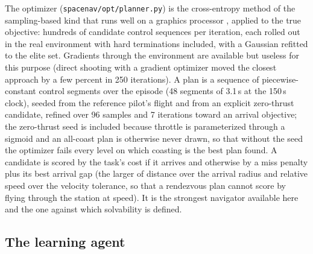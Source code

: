 \documentclass[11pt]{article}
\newcommand{\code}[1]{\texttt{\small #1}}
\begin{document}
The optimizer (\code{spacenav/opt/planner.py}) is the cross-entropy method
\cite{rubinstein1999} of the sampling-based kind that runs well on a
graphics processor \cite{williams2017}, applied to the true objective:
hundreds of candidate control sequences per iteration, each rolled out in
the real environment with hard terminations included, with a Gaussian
refitted to the elite set. Gradients through the environment are available
but useless for this purpose (direct shooting with a gradient optimizer
moved the closest approach by a few percent in 250 iterations). A plan is
a sequence of piecewise-constant control segments over the episode (48
segments of 3.1\,s at the 150\,s clock), seeded from the reference pilot's
flight and from an explicit zero-thrust candidate, refined over 96 samples
and 7 iterations toward an arrival objective; the zero-thrust seed is
included because throttle is parameterized through a sigmoid and an
all-coast plan is otherwise never drawn, so that without the seed the
optimizer fails every level on which coasting is the best plan found. A candidate is
scored by the task's cost if it arrives and otherwise by a miss penalty plus
its best arrival gap (the larger of distance over the arrival radius and
relative speed over the velocity tolerance, so that a rendezvous plan
cannot score by flying through the station at speed). It is the strongest
navigator available here and the one against which solvability is defined.

\subsection{The learning agent}
\label{sec:learning}
\end{document}
